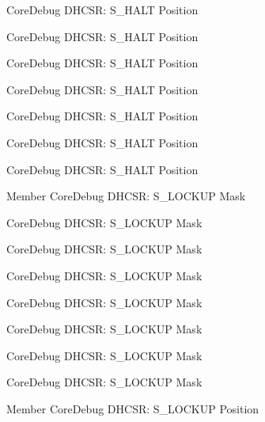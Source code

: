 \begin{DoxyRefList}
\label{deprecated__deprecated000313}%
%
Core\+Debug DHCSR\+: S\+\_\+\+HALT Position 

\label{deprecated__deprecated000389}%
%
Core\+Debug DHCSR\+: S\+\_\+\+HALT Position 

\label{deprecated__deprecated000117}%
%
Core\+Debug DHCSR\+: S\+\_\+\+HALT Position 

\label{deprecated__deprecated000476}%
%
Core\+Debug DHCSR\+: S\+\_\+\+HALT Position 

\label{deprecated__deprecated000256}%
%
Core\+Debug DHCSR\+: S\+\_\+\+HALT Position 

\label{deprecated__deprecated000171}%
%
Core\+Debug DHCSR\+: S\+\_\+\+HALT Position 

\label{deprecated__deprecated000578}%
%
Core\+Debug DHCSR\+: S\+\_\+\+HALT Position  
\item[Member \doxylink{group__CMSIS__CoreDebug_ga7b67e4506d7f464ef5dafd6219739756}{Core\+Debug\+\_\+\+DHCSR\+\_\+\+S\+\_\+\+LOCKUP\+\_\+\+Msk} ]\label{deprecated__deprecated000473}%
%
Core\+Debug DHCSR\+: S\+\_\+\+LOCKUP Mask 

\label{deprecated__deprecated000022}%
%
Core\+Debug DHCSR\+: S\+\_\+\+LOCKUP Mask 

\label{deprecated__deprecated000386}%
%
Core\+Debug DHCSR\+: S\+\_\+\+LOCKUP Mask 

\label{deprecated__deprecated000114}%
%
Core\+Debug DHCSR\+: S\+\_\+\+LOCKUP Mask 

\label{deprecated__deprecated000253}%
%
Core\+Debug DHCSR\+: S\+\_\+\+LOCKUP Mask 

\label{deprecated__deprecated000575}%
%
Core\+Debug DHCSR\+: S\+\_\+\+LOCKUP Mask 

\label{deprecated__deprecated000310}%
%
Core\+Debug DHCSR\+: S\+\_\+\+LOCKUP Mask 

\label{deprecated__deprecated000168}%
%
Core\+Debug DHCSR\+: S\+\_\+\+LOCKUP Mask  
\item[Member \doxylink{group__CMSIS__CoreDebug_ga2900dd56a988a4ed27ad664d5642807e}{Core\+Debug\+\_\+\+DHCSR\+\_\+\+S\+\_\+\+LOCKUP\+\_\+\+Pos} ]\label{deprecated__deprecated000472}%
%
Core\+Debug DHCSR\+: S\+\_\+\+LOCKUP Position 


\end{DoxyRefList}
